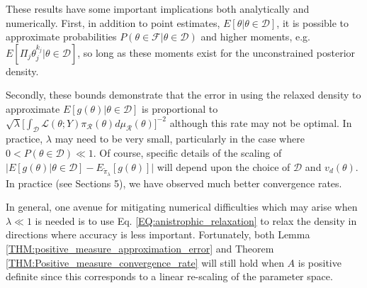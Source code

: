 \documentclass[10pt,fleqn]{article}
\DeclareMathOperator{\1}{\mathbbm{1}}
\begin{document}
These results have some important implications both analytically and numerically.  First, in addition to point estimates, $E[\theta|\theta\in\mathcal{D}]$, it is possible to approximate probabilities $P(\theta \in \mathcal{F}|\theta \in \mathcal{D})$ and higher moments, e.g. $E[\Pi_j \theta_j^{k_j} |\theta\in\mathcal{D}]$, so long as these moments exist for the unconstrained posterior density. 

Secondly, these bounds demonstrate that the error in using the relaxed density to approximate $E[g(\theta)|\theta\in\mathcal{D}]$ is proportional to $\sqrt{\lambda} [\int_\mathcal{D}\mathcal{L}(\theta; Y)  \pi_\mathcal{R}(\theta)d\mu_\mathcal{R}(\theta)\big]^{-2}$ although this rate may not be optimal.  In practice, $\lambda$ may need to be very small, particularly in the case where $0<P(\theta\in\mathcal{D})\ll 1.$ Of course, specific details of the scaling of $\bigg|E[g(\theta) |\theta\in\mathcal{D}] - E_{\tilde{\pi}_\lambda}[g(\theta)]   \bigg|$ will depend upon the choice of $\mathcal{D}$ and $v_d(\theta)$. In practice (see Sections 5), we have observed much better convergence rates.

In general, one avenue for mitigating numerical difficulties which may arise when $\lambda \ll 1$ is needed is to use Eq. \ref{EQ:anistrophic_relaxation} to relax the density in directions where accuracy is less important.  Fortunately, both Lemma \ref{THM:positive_measure_approximation_error} and Theorem \ref{THM:Positive_measure_convergence_rate} will still hold when $A$ is positive definite since this corresponds to a  linear re-scaling of the parameter space.
\end{document}
